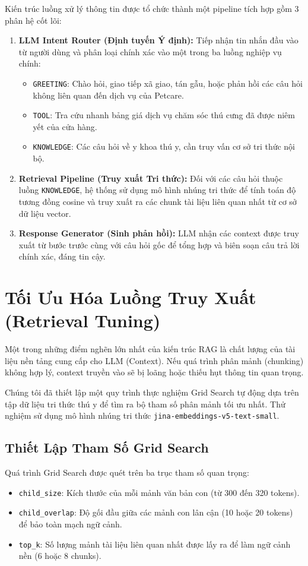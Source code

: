 \documentclass[11pt, a4paper]{article}
\begin{document}
Kiến trúc luồng xử lý thông tin được tổ chức thành một pipeline tích hợp gồm 3 phân hệ cốt lõi:
\begin{enumerate}
    \item \textbf{LLM Intent Router (Định tuyến Ý định):} Tiếp nhận tin nhắn đầu vào từ người dùng và phân loại chính xác vào một trong ba luồng nghiệp vụ chính:
    \begin{itemize}
        \item \texttt{GREETING}: Chào hỏi, giao tiếp xã giao, tán gẫu, hoặc phản hồi các câu hỏi không liên quan đến dịch vụ của Petcare.
        \item \texttt{TOOL}: Tra cứu nhanh bảng giá dịch vụ chăm sóc thú cưng đã được niêm yết của cửa hàng.
        \item \texttt{KNOWLEDGE}: Các câu hỏi về y khoa thú y, cần truy vấn cơ sở tri thức nội bộ.
    \end{itemize}
    \item \textbf{Retrieval Pipeline (Truy xuất Tri thức):} Đối với các câu hỏi thuộc luồng \texttt{KNOWLEDGE}, hệ thống sử dụng mô hình nhúng tri thức để tính toán độ tương đồng cosine và truy xuất ra các chunk tài liệu liên quan nhất từ cơ sở dữ liệu vector.
    \item \textbf{Response Generator (Sinh phản hồi):} LLM nhận các context được truy xuất từ bước trước cùng với câu hỏi gốc để tổng hợp và biên soạn câu trả lời chính xác, đáng tin cậy.
\end{enumerate}

\section{Tối Ưu Hóa Luồng Truy Xuất (Retrieval Tuning)}
Một trong những điểm nghẽn lớn nhất của kiến trúc RAG là chất lượng của tài liệu nền tảng cung cấp cho LLM (Context). Nếu quá trình phân mảnh (chunking) không hợp lý, context truyền vào sẽ bị loãng hoặc thiếu hụt thông tin quan trọng. 

Chúng tôi đã thiết lập một quy trình thực nghiệm Grid Search tự động dựa trên tập dữ liệu tri thức thú y để tìm ra bộ tham số phân mảnh tối ưu nhất. Thử nghiệm sử dụng mô hình nhúng tri thức \texttt{jina-embeddings-v5-text-small}.

\subsection{Thiết Lập Tham Số Grid Search}
Quá trình Grid Search được quét trên ba trục tham số quan trọng:
\begin{itemize}
    \item \texttt{child\_size}: Kích thước của mỗi mảnh văn bản con (từ 300 đến 320 tokens).
    \item \texttt{child\_overlap}: Độ gối đầu giữa các mảnh con lân cận (10 hoặc 20 tokens) để bảo toàn mạch ngữ cảnh.
    \item \texttt{top\_k}: Số lượng mảnh tài liệu liên quan nhất được lấy ra để làm ngữ cảnh nền (6 hoặc 8 chunks).
\end{itemize}
\end{document}
